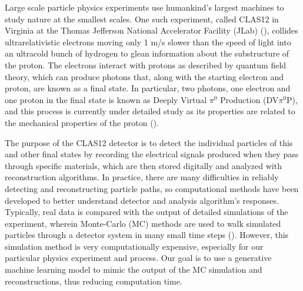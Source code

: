 \documentclass{article}
\begin{document}

Large scale particle physics experiments use humankind's largest machines to study nature at the smallest scales. One such experiment, called CLAS12 in Virginia at the Thomas Jefferson National Accelerator Facility (JLab) (\citet{BURKERT2020163419}), collides ultrarelativistic electrons moving only 1 m/s slower than the speed of light into an ultracold bunch of hydrogen to glean information about the substructure of the proton. The electrons interact with protons as described by quantum field theory, which can produce photons that, along with the starting electron and proton, are known as a final state. In particular, two photons, one electron and one proton in the final state is known as Deeply Virtual $\pi^0$ Production (DV$\pi^0$P), and this process is currently under detailed study as its properties are related to the mechanical properties of the proton (\citet{PhysRevD.55.7114}). 

The purpose of the CLAS12 detector is to detect the individual particles of this and other final states by recording the electrical signals produced when they pass through specific materials, which are then stored digitally and analyzed with reconstruction algorithms. In practice, there are many difficulties in reliably detecting and reconstructing particle paths, so computational methods have been developed to better understand detector and analysis algorithm's responses. Typically, real data is compared with the output of detailed simulations of the experiment, wherein Monte-Carlo (MC) methods are used to walk simulated particles through a detector system in many small time steps (\citet{PhysRevLett.115.212003, 10.1093/ptep/ptaa104}). However, this simulation method is very computationally expensive, especially for our particular physics experiment and process. Our goal is to use a generative machine learning model to mimic the output of the MC simulation and reconstructions, thus reducing computation time.
\end{document}
